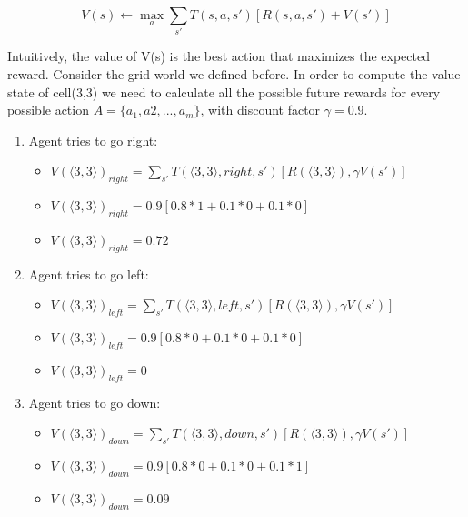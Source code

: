 \documentclass[10pt,a4paper,twocolumn]{article}
\begin{document}
	\begin{equation}
		V(s) \leftarrow \max_{a}{ \sum_{s'}T(s,a,s') [R(s,a,s') + V(s')]}
	\end{equation}
	
	Intuitively, the value of V(s) is the best action that maximizes the expected reward. Consider the grid world we defined before. In order to compute the value state of cell(3,3) we need to calculate all the possible future rewards for every possible action $A = \{ a_{1}, a{2}, ..., a_{m} \}$, with discount factor $\gamma = 0.9$.
	
	
	\begin{enumerate}
		\item Agent tries to go right: 
		\begin{itemize}
			\item $V(\big \langle 3,3 \big \rangle)_{right} = \sum_{s'} T(\big \langle 3,3 \big \rangle, right, s') [R(\big \langle 3,3 \big \rangle), \gamma V(s')]$
		\end{itemize}
		\begin{itemize}
			\item $V(\big \langle 3,3 \big \rangle)_{right} = 0.9[0.8 * 1 + 0.1 * 0 + 0.1 * 0]$
		\end{itemize}
		\begin{itemize}
			\item $V(\big \langle 3,3 \big \rangle)_{right} = 0.72$
		\end{itemize}
		
		\item Agent tries to go left: 
		\begin{itemize}
			\item $V(\big \langle 3,3 \big \rangle)_{left} = \sum_{s'} T(\big \langle 3,3 \big \rangle, left, s') [R(\big \langle 3,3 \big \rangle), \gamma V(s')]$
		\end{itemize}
		\begin{itemize}
			\item $V(\big \langle 3,3 \big \rangle)_{left} = 0.9[0.8 * 0 + 0.1 * 0 + 0.1 * 0]$
		\end{itemize}
		\begin{itemize}
			\item $V(\big \langle 3,3 \big \rangle)_{left} = 0$
		\end{itemize}
	
		\item Agent tries to go down: 
		\begin{itemize}
			\item $V(\big \langle 3,3 \big \rangle)_{down} = \sum_{s'} T(\big \langle 3,3 \big \rangle, down, s') [R(\big \langle 3,3 \big \rangle), \gamma V(s')]$
		\end{itemize}
		\begin{itemize}
			\item $V(\big \langle 3,3 \big \rangle)_{down} = 0.9[0.8 * 0 + 0.1 * 0 + 0.1 * 1]$
		\end{itemize}
		\begin{itemize}
			\item $V(\big \langle 3,3 \big \rangle)_{down} = 0.09$
		\end{itemize}
	

\end{enumerate}
\end{document}
